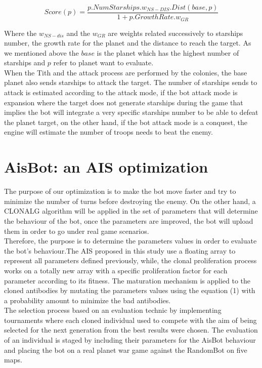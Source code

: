 \documentclass[]{interact}
\theoremstyle{plain}%
\theoremstyle{definition}
\theoremstyle{remark}
\begin{document}
\begin{equation}
Score(p) = \frac{p.NumStarships.w_{NS-DIS}.Dist(base,p)}{1+p.GrowthRate.w_{GR}}
\end{equation}

Where the $w_{NS-dis}$ and the $w_{GR}$ are weights related successively to starships number, the growth rate for the planet and the distance to reach the target. As we mentioned above the $base$ is the planet which has the highest number of starships and $p$ refer to planet want to evaluate. \\ 

When the Tith and the attack process are performed by the colonies, the base planet also sends starships to attack the target. The number of starships sends to attack is estimated according to the attack mode, if the bot attack mode is expansion where the target does not generate starships during the game that implies the bot will integrate a very specific starships number to be able to defeat the planet target, on the other hand, if the bot attack mode is a conquest, the engine will estimate the number of troops needs to beat the enemy.
\section{AisBot: an AIS optimization}
The purpose of our optimization is to make the bot move faster and try to minimize the number of turns before destroying the enemy. On the other hand, a CLONALG algorithm will be applied in the set of parameters that will determine the behaviour of the bot, once the parameters are improved, the bot will upload them in order to go under real game scenarios. \\

Therefore, the purpose is to determine the parameters values in order to evaluate the bot's behaviour.The AIS proposed in this study use a floating array to represent all parameters defined previously, while, the clonal proliferation process works on a totally new array with a specific proliferation factor for each parameter according to its fitness. The maturation mechanism is applied to the cloned antibodies by mutating the parameters values using the equation (1) with a probability amount to minimize the bad antibodies. \\

The selection process based on an evaluation technic by implementing tournaments where each cloned individual used to compete with the aim of being selected for the next generation from the best results were chosen. The evaluation of an individual is staged by including their parameters for the AisBot behaviour and placing the bot on a real planet war game against the RandomBot on five maps. \\
\end{document}
